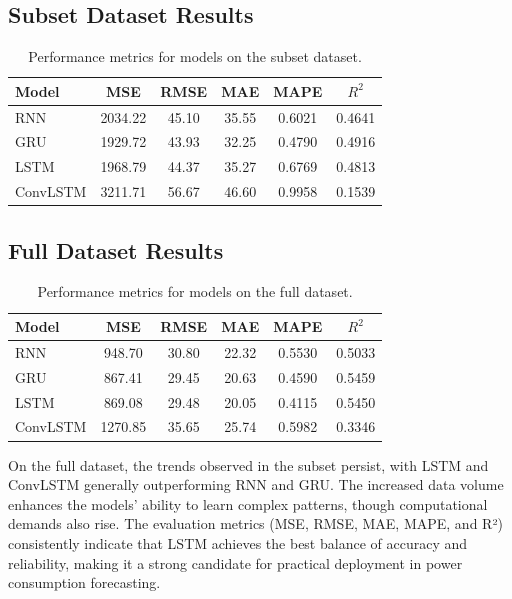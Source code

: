 	\subsection*{Subset Dataset Results}
	\begin{table}[htbp]
		\centering
		\caption{Performance metrics for models on the subset dataset.}
		\begin{tabular}{lccccc}
			\toprule
			Model & MSE & RMSE & MAE & MAPE & $R^2$ \\
			\midrule
			RNN      & 2034.22 & 45.10 & 35.55 & 0.6021 & 0.4641 \\
			GRU      & 1929.72 & 43.93 & 32.25 & 0.4790 & 0.4916 \\
			LSTM     & 1968.79 & 44.37 & 35.27 & 0.6769 & 0.4813 \\
			ConvLSTM & 3211.71 & 56.67 & 46.60 & 0.9958 & 0.1539 \\
			\bottomrule
		\end{tabular}
	\end{table}
	
	\subsection*{Full Dataset Results}
	\begin{table}[htbp]
		\centering
		\caption{Performance metrics for models on the full dataset.}
		\begin{tabular}{lccccc}
			\toprule
			Model & MSE & RMSE & MAE & MAPE & $R^2$ \\
			\midrule
			RNN      & 948.70  & 30.80 & 22.32 & 0.5530 & 0.5033 \\
			GRU      & 867.41  & 29.45 & 20.63 & 0.4590 & 0.5459 \\
			LSTM     & 869.08  & 29.48 & 20.05 & 0.4115 & 0.5450 \\
			ConvLSTM & 1270.85 & 35.65 & 25.74 & 0.5982 & 0.3346 \\
			\bottomrule
		\end{tabular}
	\end{table}
	
	On the full dataset, the trends observed in the subset persist, with LSTM and ConvLSTM generally outperforming RNN and GRU. The increased data volume enhances the models' ability to learn complex patterns, though computational demands also rise. The evaluation metrics (MSE, RMSE, MAE, MAPE, and R²) consistently indicate that LSTM achieves the best balance of accuracy and reliability, making it a strong candidate for practical deployment in power consumption forecasting.
	
